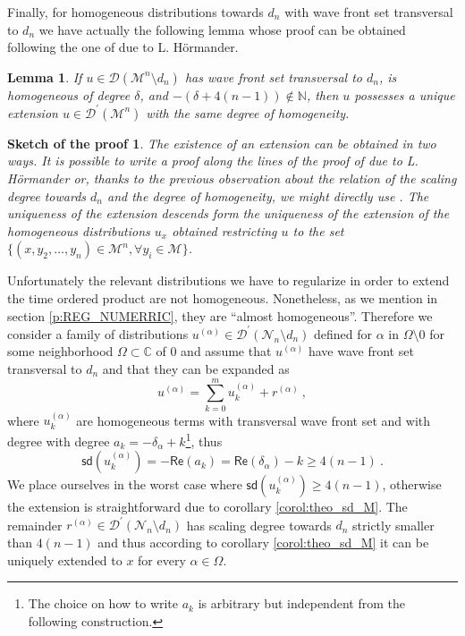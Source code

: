 \documentclass[11pt]{book}
\newcommand{\sd}{\mathsf{sd}}
\renewcommand{\Re}{\mathsf{Re}}
\newcommand{\Dcal}{\mathcal{D}}
\newcommand{\Mcal}{\mathcal{M}}
\newcommand{\Ncal}{\mathcal{N}}
\newcommand{\Cbb}{\mathbb{C}}
\newcommand{\Nbb}{\mathbb{N}}
\theoremstyle{break}
\newtheorem{lemma}{Lemma}[chapter]
\newtheorem*{sketch}{Sketch of the proof}[chapter]
\begin{document}
Finally, for homogeneous distributions towards $d_n$ with wave front set transversal to $d_n$ we have actually the following lemma whose proof can be obtained following the one of   \cite[theorem 3.2.3]{HORMANDER_1990} due to L. Hörmander.


\begin{lemma}\label{lemma:exte_homo}
If $u\in\Dcal(\Mcal^n\setminus d_n)$ has wave front set transversal to $d_n$, is homogeneous of degree $\delta$, and $-(\delta+4(n-1)) \notin \Nbb$, then $u$ possesses a unique extension $u \in \Dcal^\prime(\Mcal^n)$ with the same degree of homogeneity.
\end{lemma}


\begin{sketch}
The existence of an extension can be obtained in two ways. It is possible to write a proof along the lines of the proof of \cite[theorem 3.2.3]{HORMANDER_1990} due to L. Hörmander or, thanks to the previous observation about the relation of the scaling degree towards $d_n$ and the degree of homogeneity, we might directly use \cite[theorem 6.9]{BF_2000}. The uniqueness of the extension descends form the uniqueness of the extension of the homogeneous distributions $u_x$ obtained restricting $u$ to the set $\{ (x,y_2,\dots, y_n)\in \Mcal^n, \forall y_i\in \Mcal\}$.  
\end{sketch}


Unfortunately the relevant distributions we have to regularize in order to extend the time ordered product are not homogeneous. Nonetheless, as we mention in section \ref{p:REG_NUMERRIC}, they are ``almost homogeneous''. Therefore we consider a family of distributions $u^{(\alpha)} \in \Dcal^\prime(\Ncal_n\setminus d_n)$ defined for $\alpha$ in $\Omega\setminus 0$ for some neighborhood $\Omega \subset \Cbb$ of $0$ and assume that $u^{(\alpha)}$ have wave front set transversal to $d_n$ and that they can be expanded as
%
\begin{equation*}
u^{(\alpha)}  = \sum_{k=0}^m u^{(\alpha)}_k + r^{(\alpha)} \ ,
\end{equation*}
%
where $u^{(\alpha)}_k$ are homogeneous terms with transversal wave front set and with degree with degree $a_k = - \delta_\alpha + k$\footnote{The choice on how to write $a_k$ is arbitrary but independent from the following construction.}, thus 
%
\begin{equation*}
\sd(u^{(\alpha)}_k) = - \Re(a_k)  =\Re\left(\delta_\alpha\right) - k \geq 4(n-1) \ .
\end{equation*}
%
We place ourselves in the worst case where $\sd(u^{(\alpha)}_k) \geq 4(n-1)$, otherwise the extension is straightforward due to corollary \ref{corol:theo_sd_M}. The remainder $r^{(\alpha)}\in \Dcal^\prime(\Ncal_n\setminus d_n)$ has scaling degree towards $d_n$ strictly smaller than $4(n-1)$ and thus according to corollary \ref{corol:theo_sd_M} it can be uniquely extended to $x$ for every $\alpha \in \Omega$.
\end{document}
